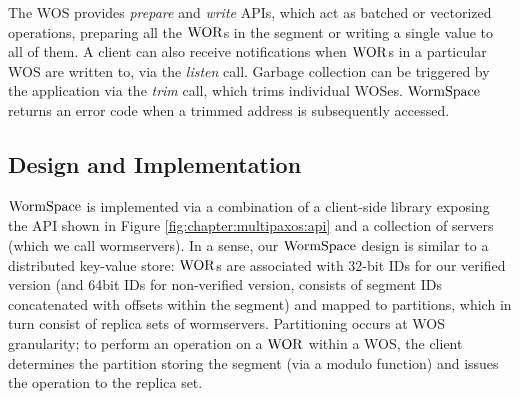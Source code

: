 The WOS provides \textit{prepare} and \textit{write} APIs, which act as batched or vectorized operations, preparing all the $\mathrm{WOR}$s in the segment or writing a single value to all of them.
A client can also receive notifications when $\mathrm{WOR}$s in a particular WOS are written to, via the \textit{listen} call.
Garbage collection can be triggered by the application via the \textit{trim} call, which trims individual WOSes. 
$\mathrm{WormSpace}$ returns an error code when a trimmed address is subsequently accessed.






\subsection{Design and Implementation}
\label{chapter:wormspace:subsec:design-and-implementation}


$\mathrm{WormSpace}$ is implemented via a combination of a client-side library exposing the API shown in 
Figure \ref{fig:chapter:multipaxos:api} and a collection of servers (which we call wormservers). 
In a sense, our $\mathrm{WormSpace}$ design is similar to a distributed key-value store: 
$\mathrm{WOR}$s are associated with 32-bit IDs for our verified version (and 64bit IDs for non-verified version, 
consists of segment IDs concatenated with offsets within the segment) and mapped to partitions, 
which in turn consist of replica sets of wormservers. Partitioning occurs at WOS granularity; 
to perform an operation on a $\mathrm{WOR}$ within a WOS, the client determines the partition storing the segment 
(via a modulo function) and issues the operation to the replica set.

